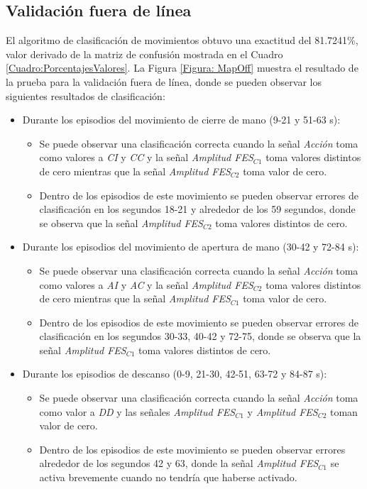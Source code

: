 \newpage
\subsection{Validación fuera de línea}
El algoritmo de clasificación de movimientos obtuvo una exactitud del 81.7241\%, valor derivado de la matriz de confusión mostrada en el Cuadro \ref{Cuadro:PorcentajesValores}. La Figura \ref{Figura: MapOff} muestra el resultado de la prueba para la validación fuera de línea, donde se pueden observar los siguientes resultados de clasificación:

\begin{itemize}
	\item Durante los episodios del movimiento de cierre de mano (9-21 y 51-63 s):
	
	\begin{itemize}
		\item Se puede observar una clasificación correcta cuando la señal \emph{Acción} toma como valores a \emph{CI} y \emph{CC} y la señal \emph{Amplitud FES$_{C1}$} toma valores distintos de cero mientras que la señal \emph{Amplitud FES$_{C2}$} toma valor de cero.
		\item Dentro de los episodios de este movimiento se pueden observar errores de clasificación en los segundos 18-21 y alrededor de los 59 segundos, donde se observa que la señal \emph{Amplitud FES$_{C2}$} toma valores distintos de cero.
	\end{itemize}
	
	\item Durante los episodios del movimiento de apertura de mano (30-42 y 72-84 s):
	
	\begin{itemize}
		\item Se puede observar una clasificación correcta cuando la señal \emph{Acción} toma como valores a \emph{AI} y \emph{AC} y la señal \emph{Amplitud FES$_{C2}$} toma valores distintos de cero mientras que la señal \emph{Amplitud FES$_{C1}$} toma valor de cero.
		\item Dentro de los episodios de este movimiento se pueden observar errores de clasificación en los segundos 30-33, 40-42 y 72-75, donde se observa que la señal \emph{Amplitud FES$_{C1}$} toma valores distintos de cero.
	\end{itemize}
		
	\item Durante los episodios de descanso (0-9, 21-30, 42-51, 63-72 y 84-87 s):
	\begin{itemize}
		\item Se puede observar una clasificación correcta cuando la señal \emph{Acción} toma como valor a \emph{DD} y las señales \emph{Amplitud FES$_{C1}$} y \emph{Amplitud FES$_{C2}$} toman valor de cero.
		\item Dentro de los episodios de este movimiento se pueden observar errores alrededor de los segundos 42 y 63, donde la señal \emph{Amplitud FES$_{C1}$} se activa brevemente cuando no tendría que haberse activado.
	\end{itemize}
\end{itemize}

